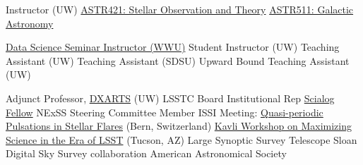 \documentclass{article}
\begin{document}
\begin{llist}
{\sc Instructor (UW)}\location{}
\href{https://jradavenport.github.io/astr421wi22/}{\color{NavyBlue}ASTR421: Stellar Observation and Theory} 
\href{https://jradavenport.github.io/astr511wi23/}{\color{NavyBlue}ASTR511: Galactic Astronomy} 

\vspace{-0.2in}
{\sc \href{https://github.com/jradavenport/WWU-seminar-2018}{\color{NavyBlue}Data Science Seminar Instructor (WWU)}} 
{\sc Student Instructor (UW)} 
{\sc Teaching Assistant (UW)} 
{\sc Teaching Assistant (SDSU)} 
{\sc Upward Bound Teaching Assistant (UW)} 





{\sc Adjunct Professor}, \href{https://dxarts.washington.edu/people/adjunct-faculty}{\color{NavyBlue}DXARTS} (UW) 
LSSTC Board Institutional Rep
{\sc \href{http://rescorp.org/scialog/time-domain-astrophysics}{\color{NavyBlue}Scialog Fellow}} 
NExSS Steering Committee Member
{\sc ISSI Meeting}: \href{http://www.issibern.ch/program/teams.html#Teams2016}{\color{NavyBlue}Quasi-periodic Pulsations in Stellar Flares} (Bern, Switzerland)
{\sc \href{http://www.noao.edu/meetings/lsst-oir-study-meeting/}{\color{NavyBlue}Kavli Workshop on Maximizing Science in the Era of LSST}} (Tucson, AZ) 
{\sc Large Synoptic Survey Telescope} 
{\sc Sloan Digital Sky Survey collaboration} 
{\sc American Astronomical Society} 




\end{llist}
\end{document}
